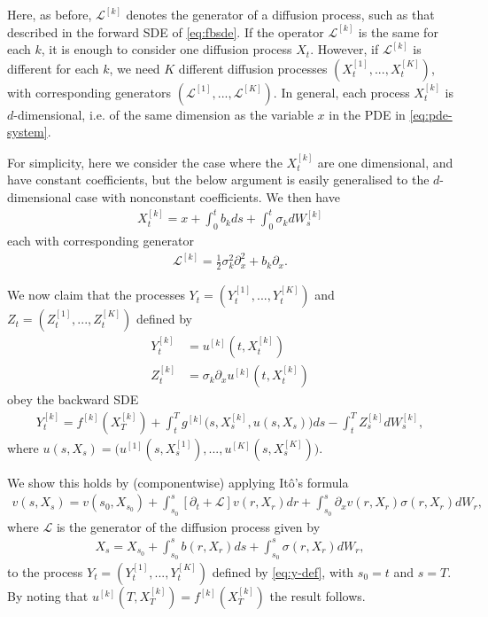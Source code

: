 \documentclass{article}  %
\begin{document}
Here, as before, $\mathcal{L}^{[k]}$ denotes the generator of a diffusion process, such as that described in the forward SDE of \autoref{eq:fbsde}. If the operator $\mathcal{L}^{[k]}$ is the same for each $k$, it is enough to consider one diffusion process $X_t$. However, if $\mathcal{L}^{[k]}$ is different for each $k$, we need $K$ different diffusion processes $(X_t^{[1]},...,X_t^{[K]})$, with corresponding generators $(\mathcal{L}^{[1]},...,\mathcal{L}^{[K]})$. In general, each process $X_t^{[k]}$ is $d$-dimensional, i.e. of the same dimension as the variable $x$ in the PDE in \autoref{eq:pde-system}. 

For simplicity, here we consider the case where the $X_t^{[k]}$ are one dimensional, and have constant coefficients, but the below argument is easily generalised to the $d$-dimensional case with nonconstant coefficients. We then have
%
\begin{align} 
    X_t^{[k]} = x + \int_{0}^{t} b_k ds + \int_{0}^{t}\sigma_k dW_s^{[k]}
\end{align}
%
each with corresponding generator
%
\begin{align} 
    \mathcal{L}^{[k]} = \frac{1}{2} \sigma_k^2 \partial_x^2 + b_k \partial_x.
\end{align}
%

We now claim that the processes $Y_t = (Y_t^{[1]},...,Y_t^{[K]})$ and $Z_t=(Z_t^{[1]},...,Z_t^{[K]})$ defined by 
%
\begin{align}
    \label{eq:y-def}
    Y_t^{[k]} &= u^{[k]}(t,X_t^{[k]})\\
    Z_t^{[k]} &= \sigma_k \partial_x u^{[k]}(t,X_t^{[k]})
\end{align}
%
obey the backward SDE
%
\begin{align} 
    \label{eq:component-bsde}
    Y_t^{[k]} = f^{[k]}(X_T^{[k]}) + \int_t^T g^{[k]}\big( s, X_s^{[k]},u(s,X_s) \big)ds - \int_t^T Z_s^{[k]}dW_s^{[k]},
\end{align}
%
where $u(s,X_s) = \big( u^{[1]}(s,X_s^{[1]}),..., u^{[K]}(s,X_s^{[K]})\big)$.

We show this holds by (componentwise) applying Itô's formula
%
\begin{align} 
    v(s,X_s) = v(s_0,X_{s_0}) + \int_{s_0}^{s} [\partial_t + \mathcal{L}] v(r,X_r)dr + \int_{s_0}^{s} \partial_x v(r,X_r) \sigma(r,X_r)dW_r,
\end{align}
%
where $\mathcal{L}$ is the generator of the diffusion process given by
%
\begin{align} 
    X_s = X_{s_0} + \int_{s_0}^{s} b(r,X_r)ds + \int_{s_0}^{s}\sigma(r,X_r)dW_r,
\end{align}
%
to the process $Y_t=(Y_t^{[1]},...,Y_t^{[K]})$ defined by \autoref{eq:y-def}, with $s_0=t$ and $s=T$. By noting that $u^{[k]}(T,X_T^{[k]})=f^{[k]}(X_T^{[k]})$ the result follows.
\end{document}
